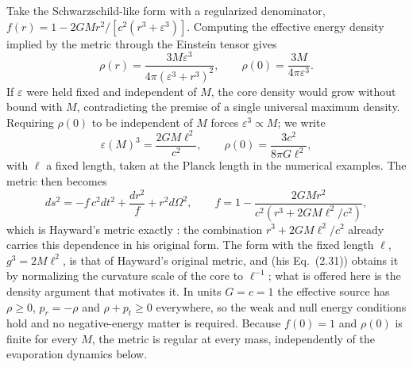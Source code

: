 \documentclass[11pt]{article}
\begin{document}
Take the Schwarzschild-like form with a regularized denominator, $f(r)=1-2GMr^2/[c^2(r^3+\varepsilon^3)]$. Computing the effective energy density implied by the metric through the Einstein tensor gives
\begin{equation}
\rho(r)=\frac{3M\varepsilon^3}{4\pi(\varepsilon^3+r^3)^2},\qquad \rho(0)=\frac{3M}{4\pi\varepsilon^3}.
\end{equation}
If $\varepsilon$ were held fixed and independent of $M$, the core density would grow without bound with $M$, contradicting the premise of a single universal maximum density. Requiring $\rho(0)$ to be independent of $M$ forces $\varepsilon^3\propto M$; we write
\begin{equation}
\varepsilon(M)^3=\frac{2GM\ell^2}{c^2},\qquad \rho(0)=\frac{3c^2}{8\pi G\ell^2},
\label{eq:eps-def}
\end{equation}
with $\ell$ a fixed length, taken at the Planck length in the numerical examples. The metric then becomes
\begin{equation}
ds^2=-f\,c^2dt^2+\frac{dr^2}{f}+r^2d\Omega^2,\qquad f=1-\frac{2GMr^2}{c^2\left(r^3+2GM\ell^2/c^2\right)},
\label{eq:metric}
\end{equation}
which is Hayward's metric exactly \citep{Hayward2006}: the combination $r^3+2GM\ell^2/c^2$ already carries this dependence in his original form. The form with the fixed length $\ell$, $g^3=2M\ell^2$, is that of Hayward's original metric, and \citet{Frolov2016} (his Eq.~(2.31)) obtains it by normalizing the curvature scale of the core to $\ell^{-1}$; what is offered here is the density argument that motivates it. In units $G=c=1$ the effective source has $\rho\ge0$, $p_r=-\rho$ and $\rho+p_t\ge0$ everywhere, so the weak and null energy conditions hold and no negative-energy matter is required. Because $f(0)=1$ and $\rho(0)$ is finite for every $M$, the metric is regular at every mass, independently of the evaporation dynamics below.
\end{document}
